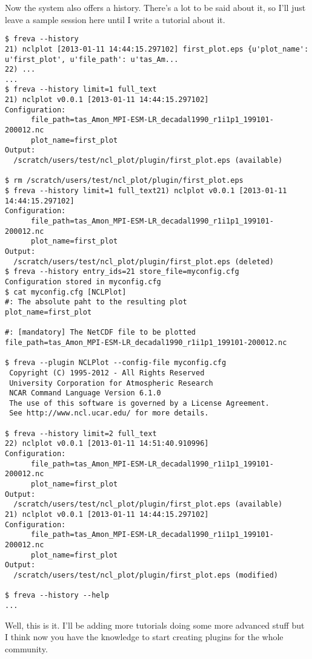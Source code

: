 \documentclass[a4paper,11pt]{ltxdoc}
\begin{document}
Now the system also offers a history. There's a lot to be said about it, so I'll just leave a sample session here until I write a tutorial about it. \\
\begin{lstlisting}
$ freva --history
21) nclplot [2013-01-11 14:44:15.297102] first_plot.eps {u'plot_name': u'first_plot', u'file_path': u'tas_Am...
22) ...
...
$ freva --history limit=1 full_text
21) nclplot v0.0.1 [2013-01-11 14:44:15.297102] 
Configuration:
      file_path=tas_Amon_MPI-ESM-LR_decadal1990_r1i1p1_199101-200012.nc
      plot_name=first_plot
Output:
  /scratch/users/test/ncl_plot/plugin/first_plot.eps (available)

$ rm /scratch/users/test/ncl_plot/plugin/first_plot.eps
$ freva --history limit=1 full_text21) nclplot v0.0.1 [2013-01-11 14:44:15.297102] 
Configuration:
      file_path=tas_Amon_MPI-ESM-LR_decadal1990_r1i1p1_199101-200012.nc
      plot_name=first_plot
Output:
  /scratch/users/test/ncl_plot/plugin/first_plot.eps (deleted)
$ freva --history entry_ids=21 store_file=myconfig.cfg
Configuration stored in myconfig.cfg
$ cat myconfig.cfg [NCLPlot]
#: The absolute paht to the resulting plot
plot_name=first_plot

#: [mandatory] The NetCDF file to be plotted
file_path=tas_Amon_MPI-ESM-LR_decadal1990_r1i1p1_199101-200012.nc

$ freva --plugin NCLPlot --config-file myconfig.cfg
 Copyright (C) 1995-2012 - All Rights Reserved
 University Corporation for Atmospheric Research
 NCAR Command Language Version 6.1.0
 The use of this software is governed by a License Agreement.
 See http://www.ncl.ucar.edu/ for more details.

$ freva --history limit=2 full_text
22) nclplot v0.0.1 [2013-01-11 14:51:40.910996] 
Configuration:
      file_path=tas_Amon_MPI-ESM-LR_decadal1990_r1i1p1_199101-200012.nc
      plot_name=first_plot
Output:
  /scratch/users/test/ncl_plot/plugin/first_plot.eps (available)
21) nclplot v0.0.1 [2013-01-11 14:44:15.297102] 
Configuration:
      file_path=tas_Amon_MPI-ESM-LR_decadal1990_r1i1p1_199101-200012.nc
      plot_name=first_plot
Output:
  /scratch/users/test/ncl_plot/plugin/first_plot.eps (modified)

$ freva --history --help
...
\end{lstlisting}

Well, this is it. I'll be adding more tutorials doing some more advanced stuff but I think now you have the knowledge to start creating plugins for the whole community. 
\end{document}
